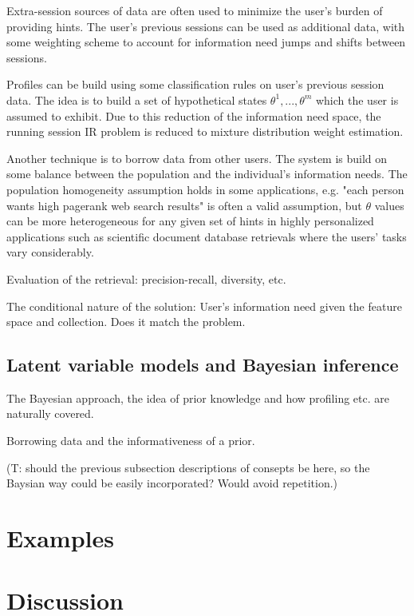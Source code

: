 \documentclass[10pt]{tufte-handout}
\begin{document}
Extra-session sources of data are often used to minimize the user's burden of providing hints. The user's previous sessions can be used as additional data, with some weighting scheme to account for information need jumps and shifts between sessions.

Profiles can be build using some classification rules on user's previous session data. The idea is to build a set of hypothetical states $\theta^1, ..., \theta^m$ which the user is assumed to exhibit. Due to this reduction of the information need space, the running session IR problem is reduced to mixture distribution weight estimation.

Another technique is to borrow data from other users. The system is build on some balance between the population and the individual's information needs. The population homogeneity assumption holds in some applications, e.g. "each person wants high pagerank web search results" is often a valid assumption, but $\theta$ values can be more heterogeneous for any given set of hints in highly personalized applications such as scientific document database retrievals where the users' tasks vary considerably.

Evaluation of the retrieval: precision-recall, diversity, etc.

The conditional nature of the solution: User's information need given the feature space and collection. Does it match the problem.

\subsection{Latent variable models and Bayesian inference}

The Bayesian approach, the idea of prior knowledge and how profiling etc. are naturally covered.

Borrowing data and the informativeness of a prior.

(T: should the previous subsection descriptions of consepts be here, so the Baysian way could be easily incorporated? Would avoid repetition.)


\section{Examples}

\section{Discussion}
\end{document}

